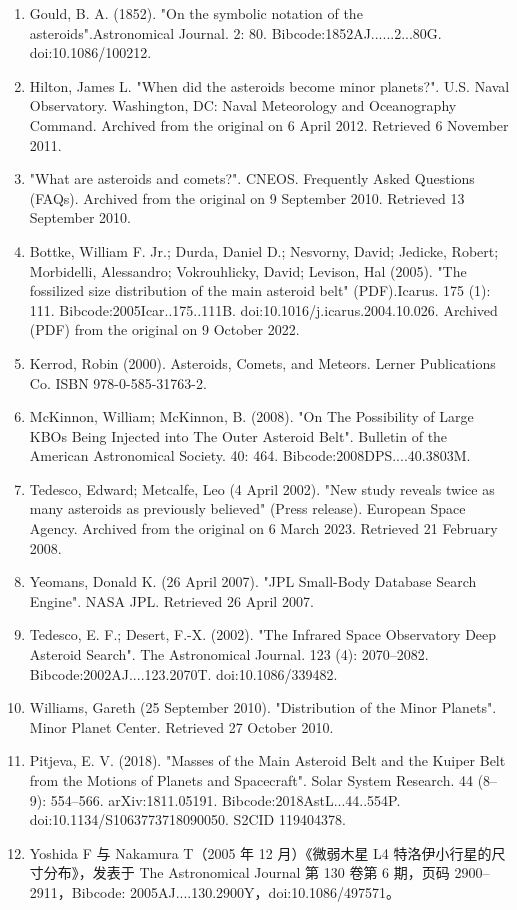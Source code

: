 \begin{enumerate}
\item Gould, B. A. (1852). "On the symbolic notation of the asteroids".Astronomical Journal. 2: 80. Bibcode:1852AJ......2...80G. doi:10.1086/100212.
\item Hilton, James L. "When did the asteroids become minor planets?". U.S. Naval Observatory. Washington, DC: Naval Meteorology and Oceanography Command. Archived from the original on 6 April 2012. Retrieved 6 November 2011.
\item "What are asteroids and comets?". CNEOS. Frequently Asked Questions (FAQs). Archived from the original on 9 September 2010. Retrieved 13 September 2010.
\item Bottke, William F. Jr.; Durda, Daniel D.; Nesvorny, David; Jedicke, Robert; Morbidelli, Alessandro; Vokrouhlicky, David; Levison, Hal (2005). "The fossilized size distribution of the main asteroid belt" (PDF).Icarus. 175 (1): 111. Bibcode:2005Icar..175..111B. doi:10.1016/j.icarus.2004.10.026. Archived (PDF) from the original on 9 October 2022.
\item Kerrod, Robin (2000). Asteroids, Comets, and Meteors. Lerner Publications Co. ISBN 978-0-585-31763-2.
\item McKinnon, William; McKinnon, B. (2008). "On The Possibility of Large KBOs Being Injected into The Outer Asteroid Belt". Bulletin of the American Astronomical Society. 40: 464. Bibcode:2008DPS....40.3803M.
\item Tedesco, Edward; Metcalfe, Leo (4 April 2002). "New study reveals twice as many asteroids as previously believed" (Press release). European Space Agency. Archived from the original on 6 March 2023. Retrieved 21 February 2008.
\item Yeomans, Donald K. (26 April 2007). "JPL Small-Body Database Search Engine". NASA JPL. Retrieved 26 April 2007.
\item Tedesco, E. F.; Desert, F.-X. (2002). "The Infrared Space Observatory Deep Asteroid Search". The Astronomical Journal. 123 (4): 2070–2082. Bibcode:2002AJ....123.2070T. doi:10.1086/339482.
\item Williams, Gareth (25 September 2010). "Distribution of the Minor Planets". Minor Planet Center. Retrieved 27 October 2010.
\item Pitjeva, E. V. (2018). "Masses of the Main Asteroid Belt and the Kuiper Belt from the Motions of Planets and Spacecraft". Solar System Research. 44 (8–9): 554–566. arXiv:1811.05191. Bibcode:2018AstL...44..554P. doi:10.1134/S1063773718090050. S2CID 119404378.
\item Yoshida F 与 Nakamura T（2005 年 12 月）《微弱木星 L4 特洛伊小行星的尺寸分布》，发表于 The Astronomical Journal 第 130 卷第 6 期，页码 2900–2911，Bibcode: 2005AJ....130.2900Y，doi:10.1086/497571。


\end{enumerate}
